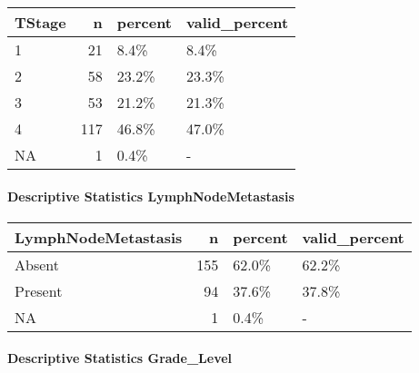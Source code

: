 \documentclass[
]{article}
\newenvironment{Shaded}{\begin{snugshade}}{\end{snugshade}}
\newcommand{\DataTypeTok}[1]{\textcolor[rgb]{0.00,0.34,0.68}{#1}}
\newcommand{\DecValTok}[1]{\textcolor[rgb]{0.69,0.50,0.00}{#1}}
\newcommand{\KeywordTok}[1]{\textcolor[rgb]{0.12,0.11,0.11}{\textbf{#1}}}
\newcommand{\NormalTok}[1]{\textcolor[rgb]{0.12,0.11,0.11}{#1}}
\newcommand{\OperatorTok}[1]{\textcolor[rgb]{0.12,0.11,0.11}{#1}}
\newcommand{\StringTok}[1]{\textcolor[rgb]{0.75,0.01,0.01}{#1}}
\begin{document}
\begin{longtable}[]{@{}lrll@{}}
\toprule
TStage & n & percent & valid\_percent\tabularnewline
\midrule
\endhead
1 & 21 & 8.4\% & 8.4\%\tabularnewline
2 & 58 & 23.2\% & 23.3\%\tabularnewline
3 & 53 & 21.2\% & 21.3\%\tabularnewline
4 & 117 & 46.8\% & 47.0\%\tabularnewline
NA & 1 & 0.4\% & -\tabularnewline
\bottomrule
\end{longtable}

\pagebreak

\hypertarget{descriptive-statistics-lymphnodemetastasis}{%
\paragraph{Descriptive Statistics
LymphNodeMetastasis}\label{descriptive-statistics-lymphnodemetastasis}}

\begin{Shaded}
\end{Shaded}

\begin{longtable}[]{@{}lrll@{}}
\toprule
LymphNodeMetastasis & n & percent & valid\_percent\tabularnewline
\midrule
\endhead
Absent & 155 & 62.0\% & 62.2\%\tabularnewline
Present & 94 & 37.6\% & 37.8\%\tabularnewline
NA & 1 & 0.4\% & -\tabularnewline
\bottomrule
\end{longtable}

\pagebreak

\hypertarget{descriptive-statistics-grade_level}{%
\paragraph{Descriptive Statistics
Grade\_Level}\label{descriptive-statistics-grade_level}}

\begin{Shaded}
\end{Shaded}
\end{document}

